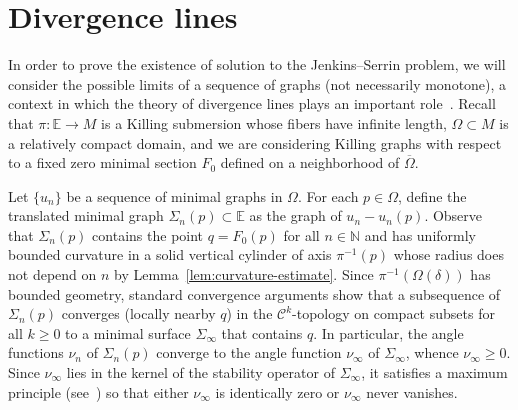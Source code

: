 \documentclass[a4paper,10pt,reqno]{amsart}
\newcommand{\N}{\mathbb{N}}
\newcommand{\E}{\mathbb{E}}
\theoremstyle{definition}
\theoremstyle{remark}
\numberwithin{equation}{section}
\begin{document}
\section{Divergence lines}\label{sec:divergence-lines}

In order to prove the existence of solution to the Jenkins--Serrin problem, we will consider the possible limits of a sequence of graphs (not necessarily monotone), a context in which the theory of divergence lines plays an important role~\cite{Mazet,MRR}. Recall that $\pi:\E\to M$ is a Killing submersion whose fibers have infinite length, $\Omega\subset M$ is a relatively compact domain, and we are considering Killing graphs with respect to a fixed zero minimal section $F_0$ defined on a neighborhood of $\overline\Omega$.

Let $\{u_n\}$ be a sequence of minimal graphs in $\Omega$. For each $p\in\Omega$, define the translated minimal graph $\Sigma_n(p)\subset\E$ as the graph of $u_n-u_n(p)$. Observe that $\Sigma_n(p)$ contains the point $q=F_0(p)$ for all $n\in\N$ and has uniformly bounded curvature in a solid vertical cylinder of axis $\pi^{-1}(p)$ whose radius does not depend on $n$ by Lemma~\ref{lem:curvature-estimate}. Since $\pi^{-1}(\Omega(\delta))$ has bounded geometry, standard convergence arguments show that a subsequence of $\Sigma_n(p)$ converges (locally nearby $q$) in the $\mathcal C^k$-topology on compact subsets for all $k\geq 0$ to a minimal surface $\Sigma_\infty$ that contains $q$. In particular, the angle functions $\nu_n$ of $\Sigma_n(p)$ converge to the angle function $\nu_\infty$ of $\Sigma_\infty$, whence $\nu_\infty\geq 0$. Since $\nu_\infty$ lies in the kernel of the stability operator of $\Sigma_\infty$, it satisfies a maximum principle (see~\cite[Ass.~2.2]{MeeksPerezRos}) so that either $\nu_\infty$ is identically zero or $\nu_\infty$ never vanishes.
\end{document}
